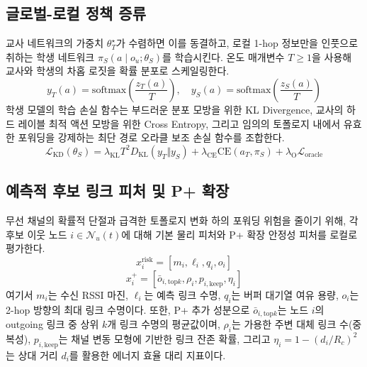 \subsection{글로벌-로컬 정책 증류}
교사 네트워크의 가중치 $\theta_T^\star$가 수렴하면 이를 동결하고, 로컬 1-hop 정보만을 인풋으로 취하는 학생 네트워크 $\pi_S(a \mid o_u; \theta_S)$를 학습시킨다. 온도 매개변수 $T \ge 1$을 사용해 교사와 학생의 차홉 로짓을 확률 분포로 스케일링한다.
\begin{equation}
    y_T(a) = \mathrm{softmax}\left(\frac{z_T(a)}{T}\right), \quad y_S(a) = \mathrm{softmax}\left(\frac{z_S(a)}{T}\right)
\end{equation}
학생 모델의 학습 손실 함수는 부드러운 분포 모방을 위한 KL Divergence, 교사의 하드 레이블 최적 액션 모방을 위한 Cross Entropy, 그리고 임의의 토폴로지 내에서 유효한 포워딩을 강제하는 최단 경로 오라클 보조 손실 함수를 조합한다.
\begin{equation}
    \mathcal{L}_{\mathrm{KD}}(\theta_S) = \lambda_{\mathrm{KL}} T^2 D_{\mathrm{KL}}(y_T \Vert y_S) + \lambda_{\mathrm{CE}} \mathrm{CE}(a_T, \pi_S) + \lambda_{\mathrm{O}} \mathcal{L}_{\mathrm{oracle}}
\end{equation}

\subsection{예측적 후보 링크 피처 및 P+ 확장}
 무선 채널의 확률적 단절과 급격한 토폴로지 변화 하의 포워딩 위험을 줄이기 위해, 각 후보 이웃 노드 $i \in \mathcal{N}_u(t)$에 대해 기본 물리 피처와 P+ 확장 안정성 피처를 로컬로 평가한다.
\begin{equation}
    x_i^{\mathrm{risk}} = [m_i, \ell_i, q_i, o_i]
\end{equation}
\begin{equation}
    x_i^{+} = [\bar{o}_{i,\mathrm{top}k}, \rho_i, p_{i,\mathrm{keep}}, \eta_i]
\end{equation}
여기서 $m_i$는 수신 RSSI 마진, $\ell_i$는 예측 링크 수명, $q_i$는 버퍼 대기열 여유 용량, $o_i$는 2-hop 방향의 최대 링크 수명이다.
또한, P+ 추가 성분으로 $\bar{o}_{i,\mathrm{top}k}$는 노드 $i$의 outgoing 링크 중 상위 $k$개 링크 수명의 평균값이며, $\rho_i$는 가용한 주변 대체 링크 수(중복성), $p_{i,\mathrm{keep}}$는 채널 변동 모형에 기반한 링크 잔존 확률, 그리고 $\eta_i = 1 - (d_i / R_c)^2$는 상대 거리 $d_i$를 활용한 에너지 효율 대리 지표이다.

